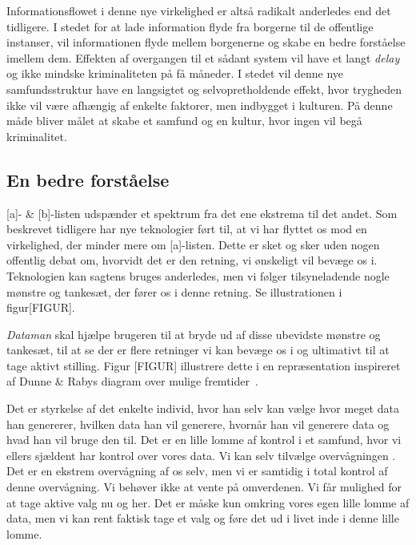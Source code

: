 \noindent Informationsflowet i denne nye virkelighed er altså radikalt anderledes end det tidligere. I stedet for at lade information flyde fra borgerne til de offentlige instanser, vil informationen flyde mellem borgenerne og skabe en bedre forståelse imellem dem. Effekten af overgangen til et sådant system vil have et langt \textit{delay} og ikke mindske kriminaliteten på få måneder. I stedet vil denne nye samfundsstruktur have en langsigtet og selvopretholdende effekt, hvor trygheden ikke vil være afhængig af enkelte faktorer, men indbygget i kulturen. På denne måde bliver målet at skabe et samfund og en kultur, hvor ingen vil begå kriminalitet.

\subsection*{En bedre forståelse}
[a]- \& [b]-listen udspænder et spektrum fra det ene ekstrema til det andet. Som beskrevet tidligere har nye teknologier ført til, at vi har flyttet os mod en virkelighed, der minder mere om [a]-listen. Dette er sket og sker uden nogen offentlig debat om, hvorvidt det er den retning, vi ønskeligt vil bevæge os i. Teknologien kan sagtens bruges anderledes, men vi følger tilsyneladende nogle mønstre og tankesæt, der fører os i denne retning. Se illustrationen i figur[FIGUR].

\textit{Dataman} skal hjælpe brugeren til at bryde ud af disse ubevidste mønstre og tankesæt, til at se der er flere retninger vi kan bevæge os i og ultimativt til at tage aktivt stilling. Figur [FIGUR] illustrere dette i en repræsentation inspireret af Dunne \& Rabys diagram over mulige fremtider~\cite[]{Dunne:2013:SED:2613526}.

Det er styrkelse af det enkelte individ, hvor han selv kan vælge hvor meget data han genererer, hvilken data han vil generere, hvornår han vil generere data og hvad han vil bruge den til. Det er en lille lomme af kontrol i et samfund, hvor vi ellers sjældent har kontrol over vores data. Vi kan selv tilvælge overvågningen \cite[]{dorrestijn2013technology}. Det er en ekstrem overvågning af os selv, men vi er samtidig i total kontrol af denne overvågning. Vi behøver ikke at vente på omverdenen. Vi får mulighed for at tage aktive valg nu og her. Det er måske kun omkring vores egen lille lomme af data, men vi kan rent faktisk tage et valg og føre det ud i livet inde i denne lille lomme.

